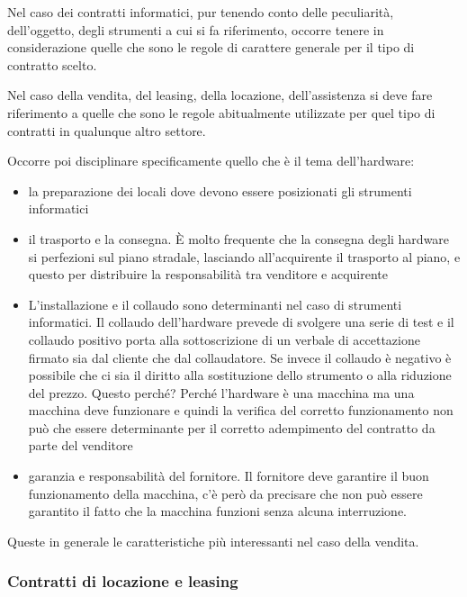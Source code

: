Nel caso dei contratti informatici, pur tenendo conto delle peculiarità, dell'oggetto, degli strumenti a cui si fa riferimento, occorre tenere in considerazione quelle che sono le regole di carattere generale per il tipo di contratto scelto. 

Nel caso della vendita, del leasing, della locazione, dell'assistenza si deve fare riferimento a quelle che sono le regole abitualmente utilizzate per quel tipo di contratti in qualunque altro settore. 

Occorre poi disciplinare specificamente quello che è il tema dell'hardware:

\begin{itemize}
    \item la preparazione dei locali dove devono essere posizionati gli strumenti informatici
    \item il trasporto e la consegna. È molto frequente che la consegna degli hardware si perfezioni sul piano stradale, lasciando all'acquirente il trasporto al piano, e questo per distribuire la responsabilità tra venditore e acquirente
    \item L'installazione e il collaudo sono determinanti nel caso di strumenti informatici. Il collaudo dell'hardware prevede di svolgere una serie di test e il collaudo positivo porta alla sottoscrizione di un verbale di accettazione firmato sia dal cliente che dal collaudatore. Se invece il collaudo è negativo è possibile che ci sia il diritto alla sostituzione dello strumento o alla riduzione del prezzo. Questo perché? Perché l'hardware è una macchina ma una macchina deve funzionare e quindi la verifica del corretto funzionamento non può che essere determinante per il corretto adempimento del contratto da parte del venditore
    \item garanzia e responsabilità del fornitore. Il fornitore deve garantire il buon funzionamento della macchina, c'è però da precisare che non può essere garantito il fatto che la macchina funzioni senza alcuna interruzione. 
\end{itemize}


Queste in generale le caratteristiche più interessanti nel caso della vendita. 

\subsubsection{Contratti di locazione e leasing}

